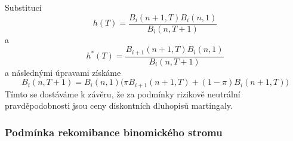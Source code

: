 \documentclass[a4paper]{book}
\begin{document}
Substitucí
\begin{equation*}
h(T) = \frac{B_i(n+1,T)B_i(n,1)}{B_i(n,T+1)}
\end{equation*}
a
\begin{equation*}
h^{*}(T) = \frac{B_{i+1}(n+1,T)B_i(n,1)}{B_i(n,T+1)}
\end{equation*}
a následnými úpravami získáme
\begin{equation*}
B_i(n,T+1) = B_i(n,1)\Big( \pi B_{i+1}(n+1,T) + (1 - \pi)B_i(n+1,T)\Big)
\end{equation*}
Tímto se dostáváme k závěru, že za podmínky rizikově neutrální pravděpodobnosti jsou ceny diskontních dluhopisů martingaly.

\subsubsection{Podmínka rekomibance binomického stromu}
\end{document}
